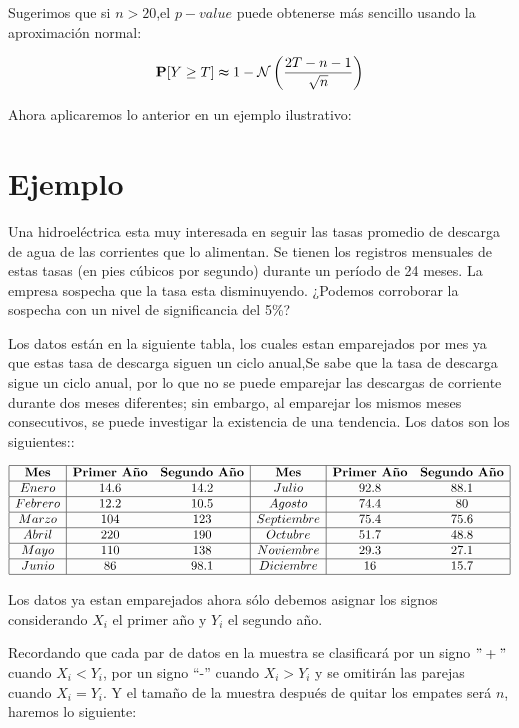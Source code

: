 \documentclass[
  a4paper,
  oneside,
  openany]{book}
\begin{document}
Sugerimos que si \(n > 20\),el \(p-value\) puede obtenerse más sencillo usando la aproximación normal:

\[\mathbf{P}[Y\geq T] \thickapprox 1- \mathcal{N} \left(\frac{2T-n-1}{\sqrt{n}}\right)\]

Ahora aplicaremos lo anterior en un ejemplo ilustrativo:

\hypertarget{ejemplo-4}{%
\section{Ejemplo}\label{ejemplo-4}}

Una hidroeléctrica esta muy interesada en seguir las tasas promedio de descarga de agua de las corrientes que lo alimentan. Se tienen los registros mensuales de estas tasas (en pies cúbicos por segundo) durante un período de 24 meses.
La empresa sospecha que la tasa esta disminuyendo. ¿Podemos corroborar la sospecha con un nivel de significancia del 5\%?

Los datos están en la siguiente tabla, los cuales estan emparejados por mes ya que estas tasa de descarga siguen un ciclo anual,Se sabe que la tasa de descarga sigue un ciclo anual, por lo que no se puede emparejar las descargas de corriente durante dos meses diferentes; sin embargo, al emparejar los mismos meses consecutivos, se puede investigar la existencia de una tendencia. Los datos son los siguientes::

\[
\begin{array}{|c| c c|c| c c|} 
\hline
\textbf{Mes} & \textbf{Primer Año} & \textbf{Segundo Año} & \textbf{Mes} & \textbf{Primer Año} & \textbf{Segundo Año}\\
\hline
Enero & 14.6 & 14.2 & Julio & 92.8 & 88.1 \\
\hline
Febrero&12.2&10.5&Agosto&74.4&80 \\
\hline
Marzo&104&123&Septiembre&75.4&75.6 \\
\hline
Abril&220&190&Octubre&51.7&48.8 \\
\hline
Mayo&110&138&Noviembre&29.3&27.1 \\
\hline
Junio&86&98.1&Diciembre&16&15.7 \\
\hline
\end{array}
\]

Los datos ya estan emparejados ahora sólo debemos asignar los signos considerando \(X_i\) el primer año y \(Y_i\) el segundo año.

Recordando que cada par de datos en la muestra se clasificará por un signo \("+"\) cuando \(X_{i} < Y_{i}\), por un signo ``-'' cuando \(X_{i} > Y_{i}\) y se omitirán las parejas cuando \(X_i = Y_i\). Y el tamaño de la muestra después de quitar los empates será \(n\), haremos lo siguiente:
\end{document}
